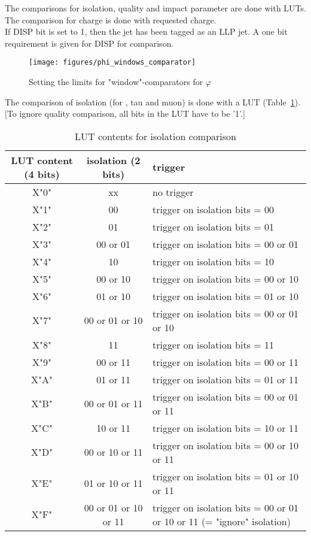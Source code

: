 \clearpage

The comparisons for isolation, quality and impact parameter are done with LUTs.\\
The comparison for charge is done with requested charge.\\
If DISP bit is set to 1, then the jet has been tagged as an LLP jet. A one bit requirement is given for DISP for comparison.\\

\begin{figure}[htb]
\centering
\texttt{[image: figures/phi\_windows\_comparator]}
\caption{Setting the limits for "window"-comparators for $\varphi$}
\label{fig:gtl:phi_windows_comparator}
\end{figure}

The comparison of isolation (for \egamma, tau and muon) is done with a LUT (Table~\ref{tab:gtl:lut_iso}). [To ignore quality comparison, all bits in the LUT have to be '1'.]

\begin{table}[ht]
\caption{LUT contents for isolation comparison}
\vspace{5mm}
\centering
\begin{tabular}{|c|c|p{}|}\hline
LUT content (4 bits) & isolation (2 bits) & trigger \\\hline\hline
X"0" & xx & no trigger\\\hline
X"1" & 00 & trigger on isolation bits = 00\\\hline
X"2" & 01 & trigger on isolation bits = 01\\\hline
X"3" & 00 or 01 & trigger on isolation bits = 00 or 01\\\hline
X"4" & 10 & trigger on isolation bits = 10\\\hline
X"5" & 00 or 10 & trigger on isolation bits = 00 or 10\\\hline
X"6" & 01 or 10 & trigger on isolation bits = 01 or 10\\\hline
X"7" & 00 or 01 or 10 & trigger on isolation bits = 00 or 01 or 10\\\hline
X"8" & 11 & trigger on isolation bits = 11\\\hline
X"9" & 00 or 11 & trigger on isolation bits = 00 or 11\\\hline
X"A" & 01 or 11 & trigger on isolation bits = 01 or 11\\\hline
X"B" & 00 or 01 or 11 & trigger on isolation bits = 00 or 01 or 11\\\hline
X"C" & 10 or 11 & trigger on isolation bits = 10 or 11\\\hline
X"D" & 00 or 10 or 11 & trigger on isolation bits = 00 or 10 or 11\\\hline
X"E" & 01 or 10 or 11 & trigger on isolation bits = 01 or 10 or 11\\\hline
X"F" & 00 or 01 or 10 or 11 & trigger on isolation bits = 00 or 01 or 10 or 11 (= "ignore" isolation)\\\hline
\end{tabular}
\label{tab:gtl:lut_iso}
\end{table}


